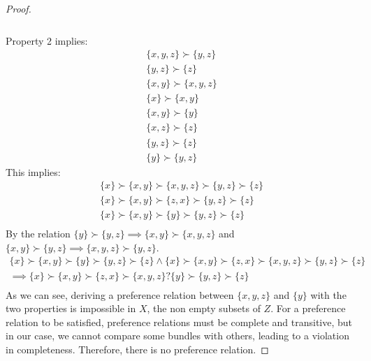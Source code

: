\documentclass{article}
\begin{document}
\begin{enumerate}[(a)]
\begin{proof}
\begin{align}
    \end{align}
    \\Property 2 implies:
    \begin{align}
         \{x,y,  z\}\succ \{y, z\}\\   \{y,  z\}\succ \{z\}\\ \{x,y\}\succ \{x, y, z\} \\ \{x\}\succ \{x,y\}\\ \{x, y\}\succ \{y\}\\  \{x, z\}\succ \{z\}\\  \{y, z\}\succ \{z\}\\ \{y\}\succ \{y, z\}
    \end{align}
    This implies:
    \begin{align}
     \{x\}\succ\{x, y\}\succ \{x, y, z\} \succ \{y, z\}\succ \{z\}\\ 
    \{x\}\succ\{x, y\}\succ \{z, x\} \succ \{y, z\}\succ \{z\}\\ \{x\}\succ\{x, y\}\succ \{y\} \succ \{y, z\}\succ \{z\}\\
    \end{align}
    By the relation  $\{y\} \succ \{y, z\}\implies \{x, y\}\succ  \{x, y, z\}$ and  $\{x, y\} \succ \{y, z\}\implies \{x, y, z\}\succ  \{y, z\}$.
    \begin{align}
        \{x\}\succ\{x, y\}\succ  \{y\}\succ\{y, z\}\succ \{z\}\land \{x\}\succ\{x, y\}\succ \{z, x\}\succ \{x, y, z\} \succ\{y, z\}\succ \{z\}\\ \implies  \{x\}\succ\{x, y\}\succ \{z, x\}\succ \{x, y, z\}   {}?{} \{y\}\succ\{y, z\}\succ \{z\}\\
    \end{align}
    As we can see, deriving a preference relation between $\{x, y, z\}$ and $\{y\}$ with the two properties is impossible in $X$, the non empty subsets of $Z$. For a preference relation to be satisfied, preference relations must be complete and transitive, but in our case, we cannot compare some bundles with others, leading to a violation in completeness. Therefore, there is no preference relation.
    \end{proof}
\end{enumerate}
\end{document}
